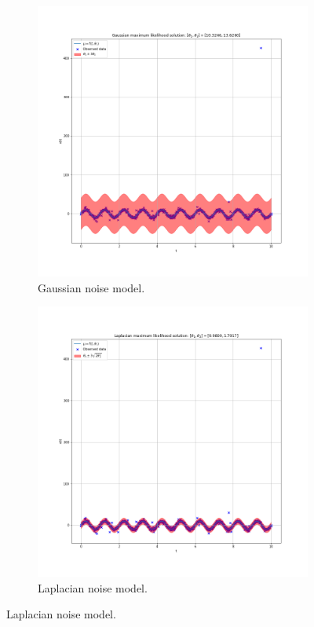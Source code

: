 \documentclass{article}
\begin{document}
\begin{figure}[!htb]
     \centering
     \begin{subfigure}[b]{0.49\textwidth}
         \centering
         \includegraphics[width=\textwidth]{Q3b_fig5.png}
         \caption{Gaussian noise model.}
     \end{subfigure}
     \hfill
     \begin{subfigure}[b]{0.49\textwidth}
         \centering
         \includegraphics[width=\textwidth]{Q3b_fig6.png}
         \caption{Laplacian noise model.}
     \end{subfigure}
     

\end{figure}
\end{document}
